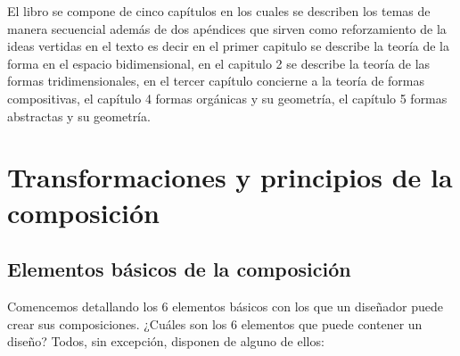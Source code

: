 \documentclass[
  16pt,
]{krantz}
\theoremstyle{definition}
\theoremstyle{definition}
\theoremstyle{definition}
\theoremstyle{definition}
\theoremstyle{remark}
\begin{document}
El libro se compone de cinco capítulos en los cuales se describen los temas de manera secuencial además de dos apéndices que sirven como reforzamiento de la ideas vertidas en el texto es decir en el primer capitulo se describe la teoría de la forma en el espacio bidimensional, en el capitulo 2 se describe la teoría de las formas tridimensionales, en el tercer capítulo concierne a la teoría de formas compositivas, el capítulo 4 formas orgánicas y su geometría, el capítulo 5 formas abstractas y su geometría.

\mainmatter

\hypertarget{transformaciones-y-principios-de-la-composiciuxf3n}{%
\chapter{Transformaciones y principios de la composición}\label{transformaciones-y-principios-de-la-composiciuxf3n}}

\hypertarget{elementos-buxe1sicos-de-la-composiciuxf3n}{%
\section{Elementos básicos de la composición}\label{elementos-buxe1sicos-de-la-composiciuxf3n}}

Comencemos detallando los 6 elementos básicos con los que un diseñador puede crear sus composiciones. ¿Cuáles son los 6 elementos que puede contener un diseño? Todos, sin excepción, disponen de alguno de ellos:
\end{document}
